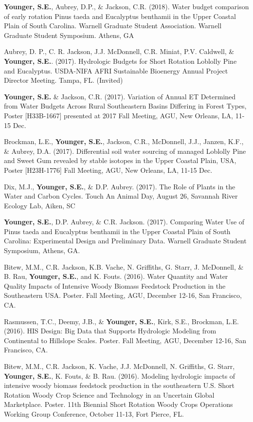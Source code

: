 \documentclass[10pt,letterpaper]{article}
\begin{document}
\begin{hangparas}{.25in}{1}
		\textbf{Younger, S.E.}, Aubrey, D.P., \& Jackson, C.R. (2018). Water budget comparison of early rotation Pinus taeda and Eucalyptus benthamii in the Upper Coastal Plain of South Carolina. Warnell Graduate Student Association. Warnell Graduate Student Symposium. Athens, GA
		
		Aubrey, D. P., C. R. Jackson, J.J. McDonnell, C.R. Miniat, P.V. Caldwell, \& \textbf{Younger, S.E.}. (2017). Hydrologic Budgets for Short Rotation Loblolly Pine and Eucalyptus. USDA-NIFA AFRI Sustainable Bioenergy Annual Project Director Meeting. Tampa, FL. (Invited)
		
		\textbf{Younger, S.E.} \& Jackson, C.R. (2017). Variation of Annual ET Determined from Water Budgets Across Rural Southeastern Basins Differing in Forest Types, Poster [H33B-1667] presented at 2017 Fall Meeting, AGU, New Orleans, LA, 11-15 Dec.
		
		Brockman, L.E., \textbf{Younger, S.E.}, Jackson, C.R., McDonnell, J.J., Janzen, K.F., \& Aubrey, D.A. (2017). Differential soil water sourcing of managed Loblolly Pine and Sweet Gum revealed by stable isotopes in the Upper Coastal Plain, USA, Poster [H23H-1776] Fall Meeting, AGU, New Orleans, LA, 11-15 Dec.
		
		Dix, M.J., \textbf{Younger, S.E.}, \& D.P. Aubrey. (2017). The Role of Plants in the Water and Carbon Cycles. Touch An Animal Day, August 26, Savannah River Ecology Lab, Aiken, SC
		
		\textbf{Younger, S.E.}, D.P. Aubrey, \& C.R. Jackson. (2017). Comparing Water Use of Pinus taeda and Eucalyptus benthamii in the Upper Coastal Plain of South Carolina: Experimental Design and Preliminary Data. Warnell Graduate Student Symposium, Athens, GA. 
		
		Bitew, M.M., C.R. Jackson, K.B. Vache, N. Griffiths, G. Starr, J. McDonnell, \& B. Rau, \textbf{Younger, S.E.}, and K. Fouts. (2016). Water Quantity and Water Quality Impacts of Intensive Woody Biomass Feedstock Production in the Southeastern USA. Poster. Fall Meeting, AGU, December 12-16, San Francisco, CA. 
		
		Rasmussen, T.C., Deemy, J.B., \& \textbf{Younger, S.E.}, Kirk, S.E., Brockman, L.E. (2016). HIS Design: Big Data that Supports Hydrologic Modeling from Continental to Hillslope Scales. Poster. Fall Meeting, AGU, December 12-16, San Francisco, CA. 
		
		Bitew, M.M., C.R. Jackson, K. Vache, J.J. McDonnell, N. Griffiths, G. Starr, \textbf{Younger, S.E.}, K. Fouts, \& B. Rau. (2016). Modeling hydrologic impacts of intensive woody biomass feedstock production in the southeastern U.S. Short Rotation Woody Crop Science and Technology in an Uncertain Global Marketplace. Poster. 11th Biennial Short Rotation Woody Crops Operations Working Group Conference, October 11-13, Fort Pierce, FL.
		

\end{hangparas}
\end{document}
